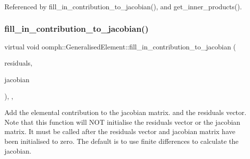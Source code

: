 Referenced by fill\+\_\+in\+\_\+contribution\+\_\+to\+\_\+jacobian(), and get\+\_\+inner\+\_\+products().

\mbox{\label{classoomph_1_1GeneralisedElement_a6ae09fc0d68e4309ac1b03583d252845}} 
\subsubsection{\texorpdfstring{fill\+\_\+in\+\_\+contribution\+\_\+to\+\_\+jacobian()}{fill\_in\_contribution\_to\_jacobian()}}
{\footnotesize\ttfamily virtual void oomph\+::\+Generalised\+Element\+::fill\+\_\+in\+\_\+contribution\+\_\+to\+\_\+jacobian (\begin{DoxyParamCaption}\item[{\hyperlink{classoomph_1_1Vector}{Vector}$<$ double $>$ \&}]{residuals,  }\item[{\hyperlink{classoomph_1_1DenseMatrix}{Dense\+Matrix}$<$ double $>$ \&}]{jacobian }\end{DoxyParamCaption})\hspace{0.3cm}{\ttfamily [inline]}, {\ttfamily [protected]}, {\ttfamily [virtual]}}



Add the elemental contribution to the jacobian matrix. and the residuals vector. Note that this function will N\+OT initialise the residuals vector or the jacobian matrix. It must be called after the residuals vector and jacobian matrix have been initialised to zero. The default is to use finite differences to calculate the jacobian. 



